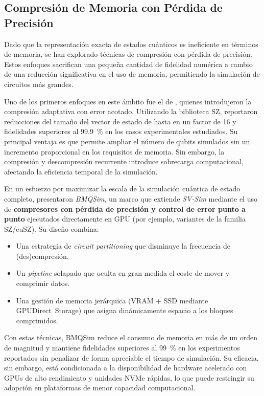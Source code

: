 \subsection{Compresión de Memoria con Pérdida de Precisión}
Dado que la representación exacta de estados cuánticos es ineficiente en términos
de memoria, se han explorado técnicas de compresión con pérdida de precisión. Estos
enfoques sacrifican una pequeña cantidad de fidelidad numérica a cambio de una
reducción significativa en el uso de memoria, permitiendo la simulación de
circuitos más grandes.

Uno de los primeros enfoques en este ámbito fue el de \textcite{wu2018amplitude, wu2019full},
quienes introdujeron la compresión adaptativa con error acotado. Utilizando la
biblioteca SZ, reportaron reducciones del tamaño del vector de estado de hasta en un factor
de 16 y fidelidades superiores al 99.9~\% en los casos experimentales estudiados. Su principal ventaja es
que permite ampliar el número de qubits simulados sin un incremento
proporcional en los requisitos de memoria. Sin embargo, la compresión y
descompresión recurrente introduce sobrecarga computacional, afectando la eficiencia
temporal de la simulación.

En un esfuerzo por maximizar la escala de la simulación cuántica de estado
completo, \textcite{Zhang2025BMQSim} presentaron \emph{BMQSim}, un marco que
extiende \emph{SV-Sim} mediante el uso de \textbf{compresores con pérdida de
precisión y control de error punto a punto} ejecutados directamente en GPU (por
ejemplo, variantes de la familia SZ/cuSZ). Su diseño
combina:
\begin{itemize}
    \item Una estrategia de \textit{circuit partitioning} que disminuye la
        frecuencia de (des)compresión.

    \item Un \textit{pipeline} solapado que oculta en gran medida el coste de
        mover y comprimir datos.

    \item Una gestión de memoria jerárquica (VRAM + SSD mediante GPUDirect~Storage)
        que asigna dinámicamente espacio a los bloques comprimidos.
\end{itemize}
Con estas técnicas, BMQSim reduce el consumo de memoria en más de un orden de magnitud
y mantiene fidelidades superiores al 99~\% en los experimentos reportados sin penalizar de forma apreciable el
tiempo de simulación. Su eficacia, sin embargo, está condicionada a la
disponibilidad de hardware acelerado con GPUs de alto rendimiento y
unidades NVMe rápidas, lo que puede restringir su adopción en plataformas de menor
capacidad computacional.

